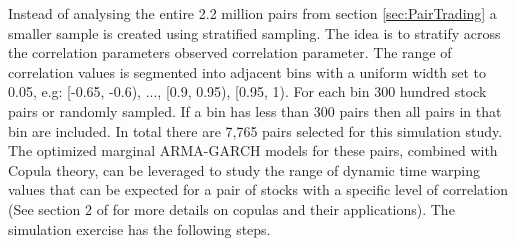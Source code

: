 \documentclass[12pt]{article}
\begin{document}
Instead of analysing the entire 2.2 million pairs from section \ref{sec:PairTrading} a smaller sample is created using stratified sampling. The idea is to stratify across the correlation parameters observed correlation parameter. The range of correlation values is segmented into adjacent bins with a uniform width set to 0.05, e.g: [-0.65, -0.6), ..., [0.9, 0.95), [0.95, 1). For each bin 300 hundred stock pairs or randomly sampled. If a bin has less than 300 pairs then all pairs in that bin are included. In total there are 7,765 pairs selected for this simulation study. The optimized marginal ARMA-GARCH models for these pairs, combined with Copula theory, can be leveraged to study the range of dynamic time warping values that can be expected for a pair of stocks with a specific level of correlation (See section 2 of \cite{DowiakTV-COP} for more details on copulas and their applications). The simulation exercise has the following steps.
\end{document}
